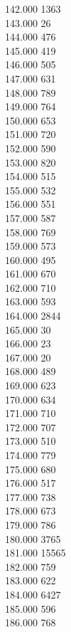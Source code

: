 { 142.000	1363 \\
 143.000	26 \\
 144.000	476 \\
 145.000	419 \\
 146.000	505 \\
 147.000	631 \\
 148.000	789 \\
 149.000	764 \\
 150.000	653 \\
 151.000	720 \\
 152.000	590 \\
 153.000	820 \\
 154.000	515 \\
 155.000	532 \\
 156.000	551 \\
 157.000	587 \\
 158.000	769 \\
 159.000	573 \\
 160.000	495 \\
 161.000	670 \\
 162.000	710 \\
 163.000	593 \\
 164.000	2844 \\
 165.000	30 \\
 166.000	23 \\
 167.000	20 \\
 168.000	489 \\
 169.000	623 \\
 170.000	634 \\
 171.000	710 \\
 172.000	707 \\
 173.000	510 \\
 174.000	779 \\
 175.000	680 \\
 176.000	517 \\
 177.000	738 \\
 178.000	673 \\
 179.000	786 \\
 180.000	3765 \\
 181.000	15565 \\
 182.000	759 \\
 183.000	622 \\
 184.000	6427 \\
 185.000	596 \\
 186.000	768 \\
}
